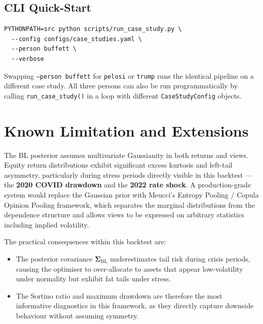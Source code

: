 \documentclass[11pt, a4paper]{article}
\newcommand{\BL}{\mathrm{BL}}
\newcommand{\code}[1]{\texttt{#1}}
\begin{document}
\subsection{CLI Quick-Start}

\begin{Verbatim}
PYTHONPATH=src python scripts/run_case_study.py \
  --config configs/case_studies.yaml \
  --person buffett \
  --verbose
\end{Verbatim}

Swapping \code{--person buffett} for \code{pelosi} or \code{trump} runs
the identical pipeline on a different case study. All three persons can also
be run programmatically by calling \code{run\_case\_study()} in a loop
with different \code{CaseStudyConfig} objects.

\section{Known Limitation and Extensions}

\begin{limitbox}
  The BL posterior assumes multivariate Gaussianity in both returns and
  views. Equity return distributions exhibit significant excess kurtosis
  and left-tail asymmetry, particularly during stress periods directly
  visible in this backtest --- the \textbf{2020 COVID drawdown} and the
  \textbf{2022 rate shock}. A production-grade system would replace the
  Gaussian prior with Meucci's Entropy Pooling / Copula Opinion Pooling
  framework, which separates the marginal distributions from the dependence
  structure and allows views to be expressed on arbitrary statistics
  including implied volatility.
\end{limitbox}

\medskip
The practical consequences within this backtest are:
\begin{itemize}
  \item The posterior covariance $\bm{\Sigma}_{\BL}$ underestimates tail risk
        during crisis periods, causing the optimiser to over-allocate to assets
        that appear low-volatility under normality but exhibit fat tails under
        stress.
  \item The Sortino ratio and maximum drawdown are therefore the most
        informative diagnostics in this framework, as they directly capture
        downside behaviour without assuming symmetry.
\end{itemize}
\end{document}
